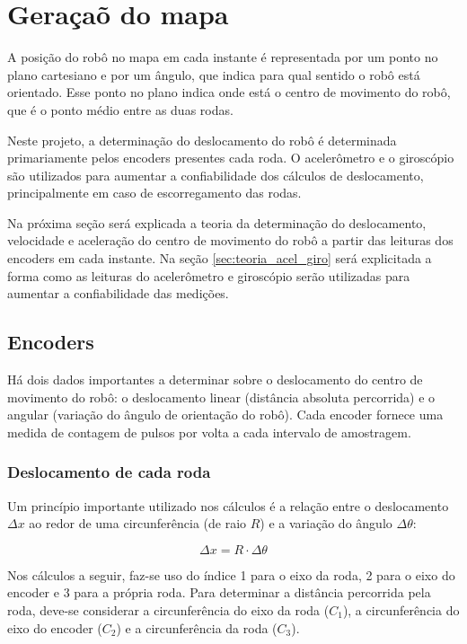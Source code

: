 \chapter{Geraçaõ do mapa}

A posição do robô no mapa em cada instante é representada por um ponto no plano cartesiano e por um ângulo, que indica para qual sentido o robô está orientado. Esse ponto no plano indica onde está o centro de movimento do robô, que é o ponto médio entre as duas rodas.

Neste projeto, a determinação do deslocamento do robô é determinada primariamente pelos encoders presentes cada roda. O acelerômetro e o giroscópio são utilizados para aumentar a confiabilidade dos cálculos de deslocamento, principalmente em caso de escorregamento das rodas.

Na próxima seção será explicada a teoria da determinação do deslocamento, velocidade e aceleração do centro de movimento do robô a partir das leituras dos encoders em cada instante. Na seção \ref{sec:teoria_acel_giro} será explicitada a forma como as leituras do acelerômetro e giroscópio serão utilizadas para aumentar a confiabilidade das medições.

\section{Encoders}

Há dois dados importantes a determinar sobre o deslocamento do centro de movimento do robô: o deslocamento linear (distância absoluta percorrida) e o angular (variação do ângulo de orientação do robô). Cada encoder fornece uma medida de contagem de pulsos por volta a cada intervalo de amostragem. 

\subsection{Deslocamento de cada roda}

Um princípio importante utilizado nos cálculos é a relação entre o deslocamento $\Delta x$ ao redor de uma circunferência (de raio $R$) e a variação do ângulo $\Delta \theta$:

\begin{equation}
  \Delta x = R \cdot \Delta \theta
  \label{eq:deslocamento_circunferencia}
\end{equation}

Nos cálculos a seguir, faz-se uso do índice 1 para o eixo da roda, 2 para o eixo do encoder e 3 para a própria roda. Para determinar a distância percorrida pela roda, deve-se considerar a circunferência do eixo da roda ($C_1$), a circunferência do eixo do encoder ($C_2$) e a circunferência da roda ($C_3$).

